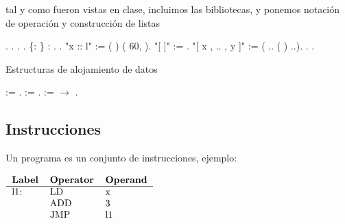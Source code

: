 \documentclass[12pt]{report}
\begin{document}
 tal y como fueron vistas en clase, incluimos las bibliotecas, y ponemos notación de operación y construcción de listas \begin{coqdoccode}
\coqdocemptyline
\coqdocnoindent
{}  .\coqdoceol
\coqdocnoindent
{}  .\coqdoceol
\coqdocnoindent
{}  .\coqdoceol
\coqdocnoindent
{}  .\coqdoceol
\coqdocemptyline
\coqdocnoindent
{}  \{: \} : . .\coqdoceol
\coqdocnoindent
{} "x :: l" := (  ) (  60,  ).\coqdoceol
\coqdocnoindent
{} "[ ]" := .\coqdoceol
\coqdocnoindent
{} "[ x , .. , y ]" := (  .. (  ) ..).\coqdoceol
\coqdocnoindent
{}  .\coqdoceol
\coqdocnoindent
{}  .\coqdoceol
\coqdocemptyline
\end{coqdoccode}
Estructuras de alojamiento de datos \begin{coqdoccode}
\coqdocnoindent
{}  := .\coqdoceol
\coqdocnoindent
{}  := .\coqdoceol
\coqdocnoindent
{}  :=  \ensuremath{\rightarrow} .\coqdoceol
\coqdocemptyline
\end{coqdoccode}
\subsection{Instrucciones}





Un programa es un conjunto de instrucciones, ejemplo:


$
\begin{tabular}{lll}
{\bf Label}              & {\bf Operator} & {\bf Operand} \\
\hline
l1: & LD & x \\
 & ADD & 3 \\
 & JMP & l1 \\
\end{tabular}
$
\end{document}
